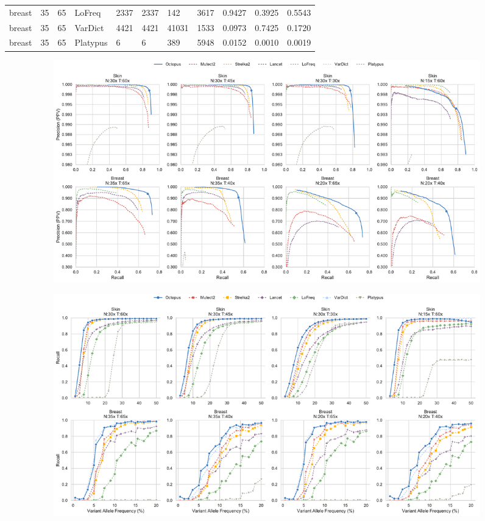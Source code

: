 \documentclass{article}
\begin{document}
\begin{table}[ht!]
{\begin{tabular}{lrrllllllll}
 breast &            35 &            65 &    LoFreq &              2337 &          2337 &       142 &      3617 &    0.9427 &      0.3925 &    0.5543 \\
 breast &            35 &            65 &   VarDict &              4421 &          4421 &     41031 &      1533 &    0.0973 &      0.7425 &    0.1720 \\
 breast &            35 &            65 &  Platypus &                 6 &             6 &       389 &      5948 &    0.0152 &      0.0010 &    0.0019 \\
\bottomrule
\end{tabular}
    }
\end{table}

\clearpage

\begin{figure}[ht!]
    \centering
    \begin{subfigure}[b]{\textwidth}
        \includegraphics[width=\textwidth]{figures/paired_somatic_precision_recall}
        \caption{}
        \label{supfig:paired-somatic-pr}
    \end{subfigure}
    \begin{subfigure}[b]{\textwidth}
        \includegraphics[width=\textwidth]{figures/paired_somatic_vaf_recall}

\end{subfigure}
\end{figure}
\end{document}

